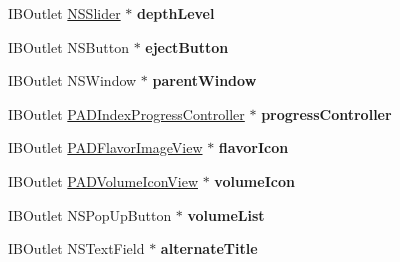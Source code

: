 \begin{DoxyCompactItemize}
\item 
\hypertarget{interface_p_a_d_add_volume_controller_a1176e457403ff0bf2057af267a0db859}{
IBOutlet \hyperlink{class_n_s_slider}{NSSlider} $\ast$ {\bfseries depthLevel}}
\label{interface_p_a_d_add_volume_controller_a1176e457403ff0bf2057af267a0db859}

\item 
\hypertarget{interface_p_a_d_add_volume_controller_a38e78ff79b1792557351178e19fdae24}{
IBOutlet NSButton $\ast$ {\bfseries ejectButton}}
\label{interface_p_a_d_add_volume_controller_a38e78ff79b1792557351178e19fdae24}

\item 
\hypertarget{interface_p_a_d_add_volume_controller_a8ebbe327ffb2d9d0003835b6010e52e0}{
IBOutlet NSWindow $\ast$ {\bfseries parentWindow}}
\label{interface_p_a_d_add_volume_controller_a8ebbe327ffb2d9d0003835b6010e52e0}

\item 
\hypertarget{interface_p_a_d_add_volume_controller_a897d522eb14bfceb727e90e6213a8a57}{
IBOutlet \hyperlink{interface_p_a_d_index_progress_controller}{PADIndexProgressController} $\ast$ {\bfseries progressController}}
\label{interface_p_a_d_add_volume_controller_a897d522eb14bfceb727e90e6213a8a57}

\item 
\hypertarget{interface_p_a_d_add_volume_controller_afc06b7152000b9a7af67f34e3d6ce1ff}{
IBOutlet \hyperlink{interface_p_a_d_flavor_image_view}{PADFlavorImageView} $\ast$ {\bfseries flavorIcon}}
\label{interface_p_a_d_add_volume_controller_afc06b7152000b9a7af67f34e3d6ce1ff}

\item 
\hypertarget{interface_p_a_d_add_volume_controller_a878aefed2d113458b0a92557a92b2f77}{
IBOutlet \hyperlink{interface_p_a_d_volume_icon_view}{PADVolumeIconView} $\ast$ {\bfseries volumeIcon}}
\label{interface_p_a_d_add_volume_controller_a878aefed2d113458b0a92557a92b2f77}

\item 
\hypertarget{interface_p_a_d_add_volume_controller_a155dab39a767892075e7e444ddf74ba3}{
IBOutlet NSPopUpButton $\ast$ {\bfseries volumeList}}
\label{interface_p_a_d_add_volume_controller_a155dab39a767892075e7e444ddf74ba3}

\item 
\hypertarget{interface_p_a_d_add_volume_controller_ac42c1833f6fae57565d9ce619d18593c}{
IBOutlet NSTextField $\ast$ {\bfseries alternateTitle}}
\label{interface_p_a_d_add_volume_controller_ac42c1833f6fae57565d9ce619d18593c}


\end{DoxyCompactItemize}
